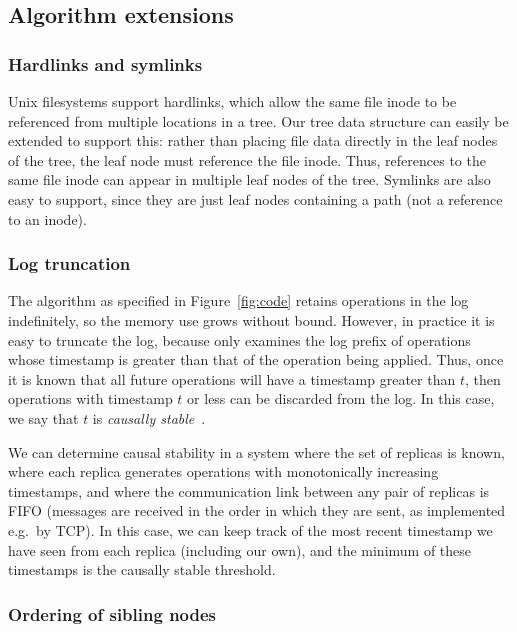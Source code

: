 \documentclass[sigplan,anonymous]{acmart}
\begin{document}
\subsection{Algorithm extensions}\label{sec:extensions}

\subsubsection{Hardlinks and symlinks}\label{sec:hardlinks}

Unix filesystems support hardlinks, which allow the same file inode to be referenced from multiple locations in a tree.
Our tree data structure can easily be extended to support this: rather than placing file data directly in the leaf nodes of the tree, the leaf node must reference the file inode.
Thus, references to the same file inode can appear in multiple leaf nodes of the tree.
Symlinks are also easy to support, since they are just leaf nodes containing a path (not a reference to an inode).

\subsubsection{Log truncation}\label{sec:log-truncation}

The algorithm as specified in Figure~\ref{fig:code} retains operations in the log indefinitely, so the memory use grows without bound.
However, in practice it is easy to truncate the log, because  only examines the log prefix of operations whose timestamp is greater than that of the operation being applied.
Thus, once it is known that all future operations will have a timestamp greater than $t$, then operations with timestamp $t$ or less can be discarded from the log.
In this case, we say that $t$ is \emph{causally stable}~\cite{Baquero:2014ed}.

We can determine causal stability in a system where the set of replicas is known, where each replica generates operations with monotonically increasing timestamps, and where the communication link between any pair of replicas is FIFO (messages are received in the order in which they are sent, as implemented e.g.\ by TCP).
In this case, we can keep track of the most recent timestamp we have seen from each replica (including our own), and the minimum of these timestamps is the causally stable threshold.

\subsubsection{Ordering of sibling nodes}\label{sec:ordering}
\end{document}
